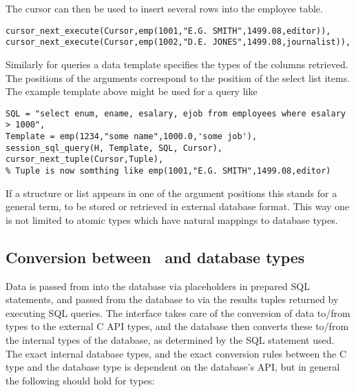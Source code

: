 The cursor can then be used to insert several rows into the employee table.

\begin{verbatim}
cursor_next_execute(Cursor,emp(1001,"E.G. SMITH",1499.08,editor)),
cursor_next_execute(Cursor,emp(1002,"D.E. JONES",1499.08,journalist)),
\end{verbatim}

Similarly for queries a data template specifies the types of the
columns retrieved. The positions of the arguments correspond to
the position of the select list items. The example template above
might be used for a query like

\begin{verbatim}
SQL = "select enum, ename, esalary, ejob from employees where esalary > 1000",
Template = emp(1234,"some name",1000.0,'some job'),
session_sql_query(H, Template, SQL, Cursor),
cursor_next_tuple(Cursor,Tuple),
% Tuple is now somthing like emp(1001,"E.G. SMITH",1499.08,editor)
\end{verbatim}

If a structure or list appears in
one of the argument positions this stands for a general term, to
be stored or retrieved in external database format. This way one is not
limited to atomic types which have natural mappings to database types.

\subsection{Conversion between \eclipse\ and database types}

Data is passed from {\eclipse\/} into the database via placeholders in
prepared SQL statements, and passed from the database to {\eclipse\/} via
the results tuples returned by executing SQL queries. 
The interface takes care of the conversion of data to/from {\eclipse\/}
types to the external C API types, and the database then converts these to/from
the internal types of the database, as determined by the SQL statement used. 
The exact internal database types, and the exact conversion rules between
the C type and the database type is dependent on the database's API, but in
general the following should hold for {\eclipse\/} types:

